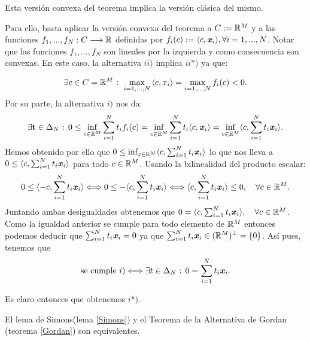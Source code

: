 	\begin{observacion}
		Esta versión convexa del teorema implica la versión clásica del mismo.
	\end{observacion}

	Para ello, basta aplicar la versión convexa del teorema a $ C := \mathbb{R}^M $ y a las funciones $ f_1,...,f_N : C \longrightarrow \mathbb{R} $ definidas por $ f_i(c):=\langle c, \textbf{\emph{x}}_i \rangle , \forall i=1,...,N  $. Notar que las funciones $ f_1,...,f_N $ son lineales por la izquierda y como consecuencia son convexas. En este caso, la alternativa $ ii) $ implica $ ii*) $ ya que:
	
	\begin{equation*}
		\exists c \in C = \mathbb{R}^M \text{ : } \max_{i=1,...,N} {\langle c,x_i \rangle}  =  \max_{i=1,...,N}f_i (c) < 0 .
	\end{equation*}
	Por su parte, la alternativa $ i) $ nos da:
	\begin{equation*}
		\exists \mathbf{t} \in \Delta_N \text{ : } 0 \leq \inf_{c \in \mathbb{R}^M}  \sum_{i=1}^{N}{t_i f_i(c) } = \inf_{c \in \mathbb{R}^M} \sum_{i=1}^{N}{t_i\langle c, \textbf{\emph{x}}_i \rangle} = \inf_{c \in \mathbb{R}^M} \langle c, \sum_{i=1}^{N}{t_i 	\textbf{\emph{x}}_i} \rangle. 
	\end{equation*}
	Hemos obtenido por ello que  $0  \leq \inf_{c \in \mathbb{R}^M} \langle c, \sum_{i=1}^{N}{t_i \textbf{\emph{x}}_i} \rangle  $ lo que nos lleva a $ 0 \leq \langle c, \sum_{i=1}^{N}{t_i \textbf{\emph{x}}_i} \rangle  $ para todo $ c \in \mathbb{R}^M $. Usando la bilinealidad del producto escalar:
	\[
	0 \leq \langle -c, \sum_{i=1}^{N}{t_i \textbf{\emph{x}}_i} \rangle \Longleftrightarrow 	0 \leq -\langle c, \sum_{i=1}^{N}{t_i \textbf{\emph{x}}_i} \rangle 
	\Longleftrightarrow  \langle c, \sum_{i=1}^{N}{t_i \textbf{\emph{x}}_i}\rangle \leq 0, \quad \forall c \in \mathbb{R}^M.
	\]
	Juntando ambas desigualdades obtenemos que $ 0 =  \langle c, \sum_{i=1}^{N}{t_i \textbf{\emph{x}}_i}\rangle, \quad \forall c \in \mathbb{R}^M $. Como la igualdad anterior se cumple para todo elemento de $ \mathbb{R}^M $ entonces podemos deducir que $ \sum_{i=1}^{N}{t_i \textbf{\emph{x}}_i} = 0 $	ya que $ \sum_{i=1}^{N}{t_i \textbf{\emph{x}}_i} \in (\mathbb{R}^M)^{\perp} = \{0\} $. Así pues, tenemos que
	\begin{equation*}
		\text{se cumple }i) \Longleftrightarrow \exists t \in \Delta_N \text{ : }  0 = \sum_{i=1}^{N}{t_i \textbf{\emph{x}}_i}.
	\end{equation*} 	
	
	Es claro entonces que obtenemos $ i*) $.
	
	\begin{observacion}
		El lema de Simons(lema \ref{Simons}) y el Teorema de la Alternativa de Gordan (teorema \ref{Gordan}) son equivalentes.
	\end{observacion}

